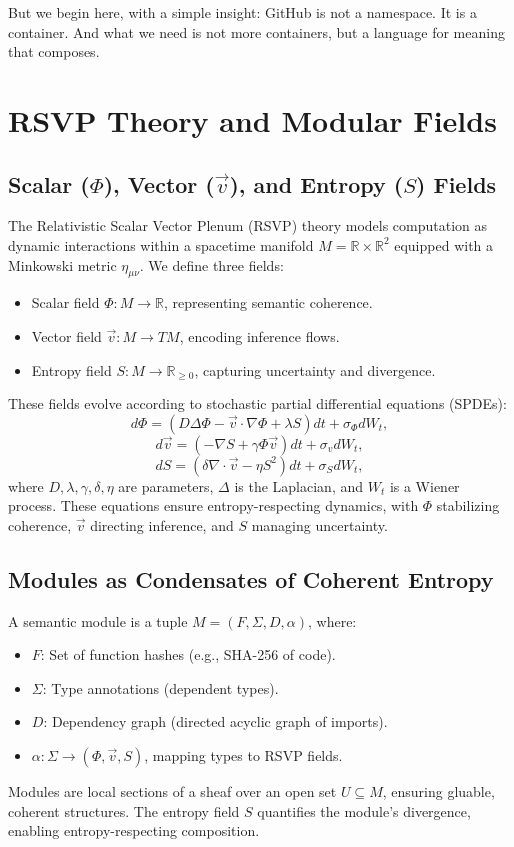 \documentclass[12pt]{article}
\begin{document}
But we begin here, with a simple insight: GitHub is not a namespace. It is a container. And what we need is not more containers, but a language for meaning that composes.

\section{RSVP Theory and Modular Fields}
\subsection{Scalar ($\Phi$), Vector ($\vec{v}$), and Entropy ($S$) Fields}
The Relativistic Scalar Vector Plenum (RSVP) theory models computation as dynamic interactions within a spacetime manifold $M = \mathbb{R} \times \mathbb{R}^2$ equipped with a Minkowski metric $\eta_{\mu\nu}$. We define three fields:
\begin{itemize}
    \item Scalar field $\Phi: M \to \mathbb{R}$, representing semantic coherence.
    \item Vector field $\vec{v}: M \to T M$, encoding inference flows.
    \item Entropy field $S: M \to \mathbb{R}_{\geq 0}$, capturing uncertainty and divergence.
\end{itemize}
These fields evolve according to stochastic partial differential equations (SPDEs):
\[
d\Phi = \left(D \Delta \Phi - \vec{v} \cdot \nabla \Phi + \lambda S\right) dt + \sigma_\Phi dW_t,
\]
\[
d\vec{v} = \left(-\nabla S + \gamma \Phi \vec{v}\right) dt + \sigma_v dW_t,
\]
\[
dS = \left(\delta \nabla \cdot \vec{v} - \eta S^2\right) dt + \sigma_S dW_t,
\]
where $D, \lambda, \gamma, \delta, \eta$ are parameters, $\Delta$ is the Laplacian, and $W_t$ is a Wiener process. These equations ensure entropy-respecting dynamics, with $\Phi$ stabilizing coherence, $\vec{v}$ directing inference, and $S$ managing uncertainty.

\subsection{Modules as Condensates of Coherent Entropy}
A semantic module is a tuple $M = (F, \Sigma, D, \alpha)$, where:
\begin{itemize}
    \item $F$: Set of function hashes (e.g., SHA-256 of code).
    \item $\Sigma$: Type annotations (dependent types).
    \item $D$: Dependency graph (directed acyclic graph of imports).
    \item $\alpha: \Sigma \to (\Phi, \vec{v}, S)$, mapping types to RSVP fields.
\end{itemize}
Modules are local sections of a sheaf over an open set $U \subseteq M$, ensuring gluable, coherent structures. The entropy field $S$ quantifies the module’s divergence, enabling entropy-respecting composition.
\end{document}
